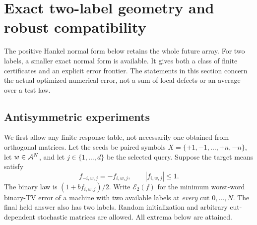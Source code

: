 \section{Exact two-label geometry and robust compatibility}\label{sec:binary47}
The positive Hankel normal form below retains the whole future array.
For two labels, a smaller exact normal form is available. It gives
both a class of finite certificates and an explicit error frontier.
The statements in this section concern the actual optimized numerical
error, not a sum of local defects or an average over a test law.

\subsection{Antisymmetric experiments}
We first allow any finite response table, not necessarily one obtained
from orthogonal matrices. Let the seeds be paired symbols
$X=\{+1,-1,\ldots,+n,-n\}$, let $w\in\mathcal A^N$, and let
$j\in\{1,\ldots,d\}$ be the selected query. Suppose the target means
satisfy
\begin{equation}\label{eq:antisym47}
 f_{-i,w,j}=-f_{i,w,j},\qquad |f_{i,w,j}|\le1.
\end{equation}
The binary law is $(1+b f_{i,w,j})/2$. Write $\mathcal E_2(f)$ for the
minimum worst-word binary-TV error of a machine with two available
labels at \emph{every} cut $0,\ldots,N$. The final held answer also
has two labels. Random initialization and arbitrary cut-dependent
stochastic matrices are allowed. All extrema below are attained.

